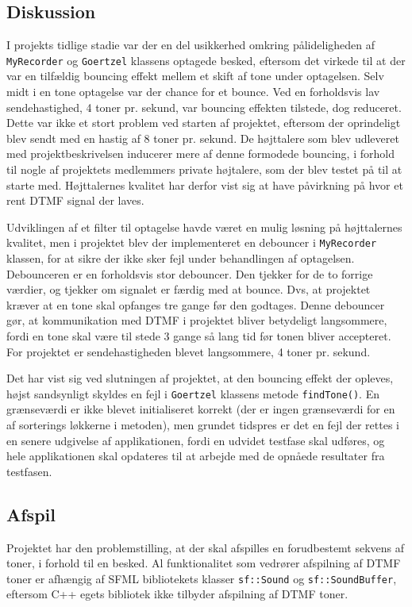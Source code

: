 \subsection{Diskussion}
I projekts tidlige stadie var der en del usikkerhed omkring pålideligheden af \texttt{MyRecorder} og \texttt{Goertzel} klassens optagede besked, eftersom det virkede til at der var en tilfældig bouncing effekt mellem et skift af tone under optagelsen. Selv midt i en tone optagelse var der chance for et bounce. Ved en forholdsvis lav sendehastighed, 4 toner pr. sekund, var bouncing effekten tilstede, dog reduceret.
\newline
Dette var ikke et stort problem ved starten af projektet, eftersom der oprindeligt blev sendt med en hastig af 8 toner pr. sekund. De højttalere som blev udleveret med projektbeskrivelsen inducerer mere af denne formodede bouncing, i forhold til nogle af projektets medlemmers private højtalere, som der blev testet på til at starte med.
\newline
Højttalernes kvalitet har derfor vist sig at have påvirkning på hvor et rent DTMF signal der laves.
\hfill \break

Udviklingen af et filter til optagelse havde været en mulig løsning på højttalernes kvalitet, men i projektet blev der implementeret en debouncer i \texttt{MyRecorder} klassen, for at sikre der ikke sker fejl under behandlingen af optagelsen. Debounceren er en forholdsvis stor debouncer. Den tjekker for de to forrige værdier, og tjekker om signalet er færdig med at bounce. Dvs, at projektet kræver at en tone skal opfanges tre gange før den godtages. Denne debouncer gør, at kommunikation med DTMF i projektet bliver betydeligt langsommere, fordi en tone skal være til stede 3 gange så lang tid før tonen bliver accepteret. For projektet er sendehastigheden blevet langsommere, 4 toner pr. sekund.
\hfill \break

Det har vist sig ved slutningen af projektet, at den bouncing effekt der opleves, højst sandsynligt skyldes en fejl i \texttt{Goertzel} klassens metode \texttt{findTone()}. En grænseværdi er ikke blevet initialiseret korrekt (der er ingen grænseværdi for en af sorterings løkkerne i metoden), men grundet tidspres er det en fejl der rettes i en senere udgivelse af applikationen, fordi en udvidet testfase skal udføres, og hele applikationen skal opdateres til at arbejde med de opnåede resultater fra testfasen.

\subsection{Afspil}
Projektet har den problemstilling, at der skal afspilles en forudbestemt sekvens af toner, i forhold til en besked.
\newline
Al funktionalitet som vedrører afspilning af DTMF toner er afhængig af SFML bibliotekets klasser \texttt{sf::\textcolor{dkgreen}{Sound}} og \texttt{sf::\textcolor{dkgreen}{SoundBuffer}}, eftersom C++ egets bibliotek ikke tilbyder afspilning af DTMF toner.
\hfill \break

